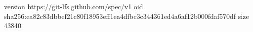 version https://git-lfs.github.com/spec/v1
oid sha256:ea82c83dbbef21c80f18953eff1ea4dfbc3c344361ed4a6af12b000fdaf570df
size 43840
